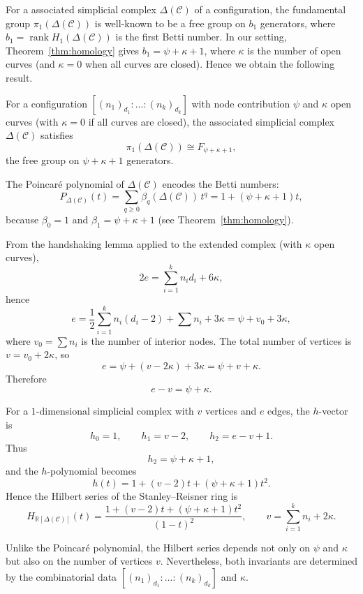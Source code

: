 \documentclass[article,11pt]{amsart} \numberwithin{equation}{section}
\numberwithin{equation}{section}
\begin{document}
{For a associated simplicial complex $\Delta(\mathcal{C})$ of a configuration, the fundamental group $\pi_1(\Delta(\mathcal{C}))$ is well‑known to be a free group on $b_1$ generators, where $b_1 = \operatorname{rank} H_1(\Delta(\mathcal{C}))$ is the first Betti number. In our setting, Theorem~\ref{thm:homology} gives $b_1 = \psi + \kappa + 1$, where $\kappa$ is the number of open curves (and $\kappa=0$ when all curves are closed). Hence we obtain the following result.

\begin{thm}\label{thm:fundamental}
	For a configuration $[(n_1)_{d_1}:\dots:(n_k)_{d_k}]$ with node contribution $\psi$ and $\kappa$ open curves (with $\kappa=0$ if all curves are closed), the associated simplicial complex $\Delta(\mathcal{C})$ satisfies
	\[
	\pi_1(\Delta(\mathcal{C})) \cong F_{\psi+\kappa+1},
	\]
	the free group on $\psi+\kappa+1$ generators.
\end{thm}

The Poincar\'e polynomial of $\Delta(\mathcal{C})$ encodes the Betti numbers:
\[
P_{\Delta(\mathcal{C})}(t)=\sum_{q\ge 0}\beta_q(\Delta(\mathcal{C}))\,t^q = 1+(\psi+\kappa+1)t,
\]
because $\beta_0=1$ and $\beta_1=\psi+\kappa+1$ (see Theorem~\ref{thm:homology}).

From the handshaking lemma applied to the extended complex (with $\kappa$ open curves),
\[
2e = \sum_{i=1}^{k} n_i d_i + 6\kappa,
\]
hence
\[
e = \frac{1}{2}\sum_{i=1}^{k} n_i(d_i-2) + \sum n_i + 3\kappa = \psi + v_0 + 3\kappa,
\]
where $v_0 = \sum n_i$ is the number of interior nodes. The total number of vertices is $v = v_0 + 2\kappa$, so
\[
e = \psi + (v - 2\kappa) + 3\kappa = \psi + v + \kappa.
\]
Therefore
\[
e - v = \psi + \kappa.
\]

For a $1$-dimensional simplicial complex with $v$ vertices and $e$ edges, the $h$-vector is
\[
h_0=1,\qquad h_1=v-2,\qquad h_2=e-v+1.
\]
Thus
\[
h_2 = \psi + \kappa + 1,
\]
and the $h$-polynomial becomes
\[
h(t)=1+(v-2)t+(\psi+\kappa+1)t^2.
\]
Hence the Hilbert series of the Stanley–Reisner ring is
\[
H_{\mathbb{R}[\Delta(\mathcal{C})]}(t)=\frac{1+(v-2)t+(\psi+\kappa+1)t^2}{(1-t)^2},\qquad 
v = \sum_{i=1}^{k} n_i + 2\kappa.
\]

Unlike the Poincar\'e polynomial, the Hilbert series depends not only on $\psi$ and $\kappa$ but also on the number of vertices $v$. Nevertheless, both invariants are determined by the combinatorial data $[(n_1)_{d_1}:\dots:(n_k)_{d_k}]$ and $\kappa$.

}
\end{document}
